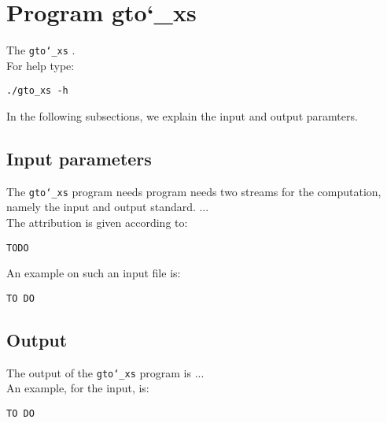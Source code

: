 \section{Program gto\char`_xs}
The \texttt{gto\char`_xs} .\\
For help type:
\begin{lstlisting}
./gto_xs -h
\end{lstlisting}
In the following subsections, we explain the input and output paramters.

\subsection*{Input parameters}

The \texttt{gto\char`_xs} program needs program needs two streams for the computation, namely the input and output standard. ...\\
The attribution is given according to:
\begin{lstlisting}
TODO
\end{lstlisting}
An example on such an input file is:
\begin{lstlisting}
TO DO
\end{lstlisting}

\subsection*{Output}
The output of the \texttt{gto\char`_xs} program is ...\\
An example, for the input, is:
\begin{lstlisting}
TO DO
\end{lstlisting}
